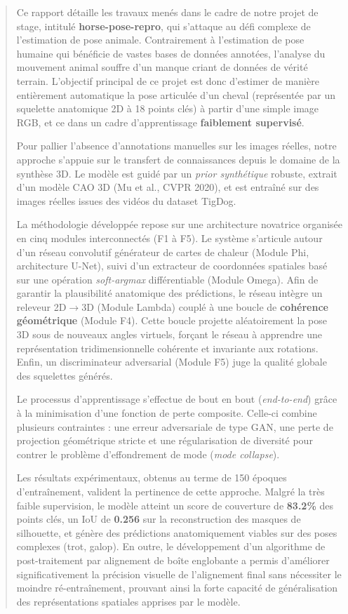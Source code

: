 \documentclass[12pt,a4paper]{article}
\begin{document}
\newpage
\thispagestyle{empty}
\renewcommand{\abstractname}{Résumé}
\begin{abstract}
Ce rapport détaille les travaux menés dans le cadre de notre projet de stage, intitulé \textbf{horse-pose-repro}, qui s'attaque au défi complexe de l'estimation de pose animale. Contrairement à l'estimation de pose humaine qui bénéficie de vastes bases de données annotées, l'analyse du mouvement animal souffre d'un manque criant de données de vérité terrain. L'objectif principal de ce projet est donc d'estimer de manière entièrement automatique la pose articulée d'un cheval (représentée par un squelette anatomique 2D à 18 points clés) à partir d'une simple image RGB, et ce dans un cadre d'apprentissage \textbf{faiblement supervisé}. 

Pour pallier l'absence d'annotations manuelles sur les images réelles, notre approche s'appuie sur le transfert de connaissances depuis le domaine de la synthèse 3D. Le modèle est guidé par un \emph{prior synthétique} robuste, extrait d'un modèle CAO 3D (Mu et al., CVPR 2020), et est entraîné sur des images réelles issues des vidéos du dataset TigDog. 

La méthodologie développée repose sur une architecture novatrice organisée en cinq modules interconnectés (F1 à F5). Le système s'articule autour d'un réseau convolutif générateur de cartes de chaleur (Module Phi, architecture U-Net), suivi d'un extracteur de coordonnées spatiales basé sur une opération \textit{soft-argmax} différentiable (Module Omega). Afin de garantir la plausibilité anatomique des prédictions, le réseau intègre un releveur 2D$\to$3D (Module Lambda) couplé à une boucle de \textbf{cohérence géométrique} (Module F4). Cette boucle projette aléatoirement la pose 3D sous de nouveaux angles virtuels, forçant le réseau à apprendre une représentation tridimensionnelle cohérente et invariante aux rotations. Enfin, un discriminateur adversarial (Module F5) juge la qualité globale des squelettes générés.

Le processus d'apprentissage s'effectue de bout en bout (\textit{end-to-end}) grâce à la minimisation d'une fonction de perte composite. Celle-ci combine plusieurs contraintes : une erreur adversariale de type GAN, une perte de projection géométrique stricte et une régularisation de diversité pour contrer le problème d'effondrement de mode (\textit{mode collapse}).

Les résultats expérimentaux, obtenus au terme de 150 époques d'entraînement, valident la pertinence de cette approche. Malgré la très faible supervision, le modèle atteint un score de couverture de \textbf{83.2\%} des points clés, un IoU de \textbf{0.256} sur la reconstruction des masques de silhouette, et génère des prédictions anatomiquement viables sur des poses complexes (trot, galop). En outre, le développement d'un algorithme de post-traitement par alignement de boîte englobante a permis d'améliorer significativement la précision visuelle de l'alignement final sans nécessiter le moindre ré-entraînement, prouvant ainsi la forte capacité de généralisation des représentations spatiales apprises par le modèle.
\end{abstract}
\end{document}
